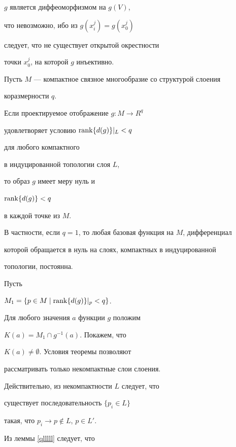 $g$ является диффеоморфизмом на $g(V)$,


что невозможно, ибо из $g(x^j_i) = g(x^j_0)$


следует, что не существует открытой окрестности


точки $x^j_0$, на которой $g$ инъективно.





\begin{thm} \label{qnzzzzzzz}


Пусть $M$ --- компактное связное многообразие со структурой слоения


коразмерности $q$.


Если проектируемое отображение $g : M \to R^q$


удовлетворяет условию $\operatorname{rank}\{ d(g)\} |_L < q$


для любого компактного


в индуцированной топологии слоя $L$,


то образ $g$ имеет меру нуль и


$\operatorname{rank}\{ d(g)\} < q$


в каждой точке из $M$.





В частности, если $q=1$, то любая базовая функция на $M$, дифференциал


которой обращается в нуль на слоях, компактных в индуцированной


топологии, постоянна.


\end{thm}





Пусть


$M_1 = \{p\in M \mid\operatorname{rank}\{ d(g)\} |_p < q \}$.


Для любого значения $a$ функции $g$ положим


$K(a) = M_1 \cap g^{-1}(a)$. Покажем, что


$K(a)\not=\emptyset$. Условия теоремы позволяют


рассматривать только некомпактные слои слоения.


Действительно, из некомпактности $L$ следует, что


существует последовательность $\{p_i \in L\}$


такая, что $ p_i \to p \notin L$, $p \in L'$.


Из леммы \ref{qlllll} следует, что


